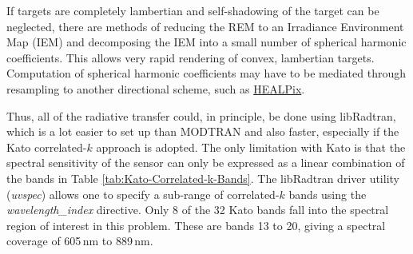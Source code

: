 If targets are completely lambertian and self-shadowing of the target
can be neglected, there are methods of reducing the REM to an Irradiance
Environment Map (IEM) and decomposing the IEM into a small number
of spherical harmonic coefficients. This allows very rapid rendering
of convex, lambertian targets. Computation of spherical harmonic coefficients
may have to be mediated through resampling to another directional
scheme, such as \href{http://healpix.jpl.nasa.gov/}{HEALPix}.

Thus, all of the radiative transfer could, in principle, be done using
libRadtran, which is a lot easier to set up than MODTRAN and also
faster, especially if the Kato correlated-$k$ approach is adopted.
The only limitation with Kato is that the spectral sensitivity of
the sensor can only be expressed as a linear combination of the bands
in Table \ref{tab:Kato-Correlated-k-Bands}. The libRadtran driver
utility (\textit{uvspec}) allows one to specify a sub-range of correlated-$k$
bands using the \textit{wavelength\_index} directive. Only 8 of the
32 Kato bands fall into the spectral region of interest in this problem.
These are bands 13 to 20, giving a spectral coverage of 605\,nm to
889\,nm.
